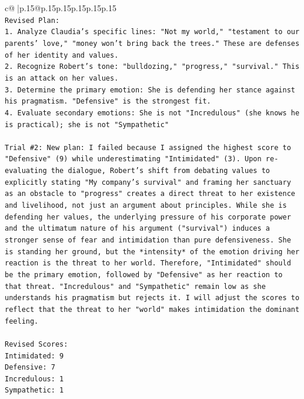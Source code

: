 \documentclass{article}
\begin{document}
{\begin{supertabular}{c@{$\;$}|p{.15\linewidth}@{}p{.15\linewidth}p{.15\linewidth}p{.15\linewidth}p{.15\linewidth}p{.15\linewidth}}
{{{\\ 
\texttt{Revised Plan:} \\
\texttt{1. Analyze Claudia's specific lines: "Not my world," "testament to our parents' love," "money won't bring back the trees." These are defenses of her identity and values.} \\
\texttt{2. Recognize Robert's tone: "bulldozing," "progress," "survival." This is an attack on her values.} \\
\texttt{3. Determine the primary emotion: She is defending her stance against his pragmatism. "Defensive" is the strongest fit.} \\
\texttt{4. Evaluate secondary emotions: She is not "Incredulous" (she knows he is practical); she is not "Sympathetic"} \\
\\ 
\texttt{Trial \#2: New plan: I failed because I assigned the highest score to "Defensive" (9) while underestimating "Intimidated" (3). Upon re{-}evaluating the dialogue, Robert's shift from debating values to explicitly stating "My company's survival" and framing her sanctuary as an obstacle to "progress" creates a direct threat to her existence and livelihood, not just an argument about principles. While she is defending her values, the underlying pressure of his corporate power and the ultimatum nature of his argument ("survival") induces a stronger sense of fear and intimidation than pure defensiveness. She is standing her ground, but the *intensity* of the emotion driving her reaction is the threat to her world. Therefore, "Intimidated" should be the primary emotion, followed by "Defensive" as her reaction to that threat. "Incredulous" and "Sympathetic" remain low as she understands his pragmatism but rejects it. I will adjust the scores to reflect that the threat to her "world" makes intimidation the dominant feeling.} \\
\\ 
\texttt{Revised Scores:} \\
\texttt{Intimidated: 9} \\
\texttt{Defensive: 7} \\
\texttt{Incredulous: 1} \\
\texttt{Sympathetic: 1} \\
\\ 
}}}
\end{supertabular}}
\end{document}
